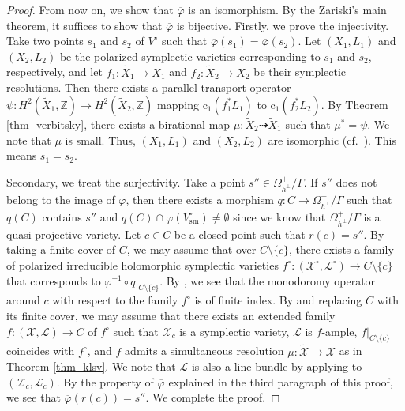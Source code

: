 \documentclass[12pt,twoside]{amsart}
\theoremstyle{definition}
\begin{document}
\begin{proof}
From now on, we show that $\overline{\varphi}$ is an isomorphism. By the Zariski's main theorem, it suffices to show that $\overline{\varphi}$ is bijective.
Firstly, we prove the injectivity.
Take two points $s_1$ and $s_2$ of $V^\circ$ such that $\overline{\varphi}(s_1)=\overline{\varphi}(s_2)$. 
Let $(X_1,L_1)$ and $(X_2,L_2)$ be the polarized symplectic varieties corresponding to $s_{1}$ and $s_{2}$, respectively, and let $f_1\colon\tilde{X}_1\to X_1$ and $f_2\colon\tilde{X}_2\to X_2$ be their symplectic resolutions. 
Then there exists a parallel-transport operator 
$\psi\colon H^2(\tilde{X}_1,\mathbb{Z})\to H^2(\tilde{X}_2,\mathbb{Z})$ 
mapping $\mathrm{c}_1(f_1^*L_1)$ to $\mathrm{c}_1(f_2^*L_2)$.
By Theorem \ref{thm--verbitsky}, there exists a birational map $\mu\colon \tilde{X}_2\dashrightarrow\tilde{X}_1$ such that $\mu^*=\psi$.
We note that $\mu$ is small.
Thus, $(X_1,L_1)$ and $(X_2,L_2)$ are isomorphic (cf.~\cite[Theorem 11.39]{kollar-moduli}).
This means $s_1=s_2$.

Secondary, we treat the surjectivity.
Take a point $s''\in \Omega_{h^{\perp}}^+/\Gamma$.
If $s''$ does not belong to the image of $\varphi$, then there exists a morphism $q\colon C\to \Omega_{h^{\perp}}^+/\Gamma$ such that $q(C)$ contains $s''$ and $q(C)\cap \varphi(V^\circ_{\mathrm{sm}})\ne\emptyset$ since we know that $\Omega_{h^{\perp}}^+/\Gamma$ is a quasi-projective variety. 
Let $c\in C$ be a closed point such that $r(c)=s''$.
By taking a finite cover of $C$, we may assume that over $C\setminus\{c\}$, there exists a family of polarized irreducible holomorphic symplectic varieties $f^\circ\colon (\mathcal{X}^\circ,\mathcal{L}^\circ)\to C\setminus\{c\}$ that corresponds to $\varphi^{-1}\circ q|_{C\setminus\{c\}}$.
By \cite[Remark of Thm.~4.11]{Griffiths}, we see that the monodoromy operator around $c$ with respect to the family $f^\circ$ is of finite index.
By \cite[Corollary 5.2]{KLSV} and replacing $C$ with its finite cover, we may assume that there exists an extended family $f\colon (\mathcal{X},\mathcal{L})\to C$ of $f^\circ$ such that $\mathcal{X}_c$ is a symplectic variety, $\mathcal{L}$ is $f$-ample, $f|_{C\setminus\{c\}}$ coincides with $f^\circ$, and $f$ admits a simultaneous resolution $\mu\colon\widetilde{\mathcal{X}}\to\mathcal{X}$ as in Theorem \ref{thm--klsv}. 
We note that $\mathcal{L}$ is also a line bundle by applying \cite[Lemma 3.1]{has-lc-trivial-fib} to $(\mathcal{X}_c,\mathcal{L}_c)$.
By the property of $\overline{\varphi}$ explained in the third paragraph of this proof, we see that $\overline{\varphi}(r(c))=s''$.
We complete the proof.
\end{proof}
\end{document}

